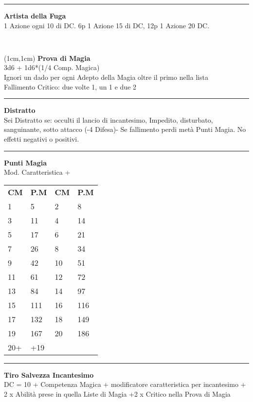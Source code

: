 \documentclass[a4paper,12 pt,openany]{book}
\newcommand{\riga}{\rule{\textwidth}{0.4pt}}
\begin{document}
\begin{textblock*}{7cm}
\riga

\textbf{Artista della Fuga}\\
1 Azione ogni 10 di DC. 6p 1 Azione 15 di DC, 12p 1 Azione 20 DC.

\end{textblock*}

~\newpage

\begin{textblock*}{5cm}(1cm,1cm) %
\textbf{Prova di Magia}\\
3d6 + 1d6*(1/4 Comp. Magica)\\
Ignori un dado per ogni Adepto della Magia oltre il primo nella lista\\
Fallimento Critico: due volte 1, un 1 e due 2\\


\riga

\textbf{Distratto}\\
Sei Distratto se: occulti il lancio di incantesimo, Impedito, disturbato, sanguinante, sotto attacco (-4 Difesa)-
Se fallimento perdi metà Punti Magia. No effetti negativi o positivi.\\

\riga

\textbf{Punti Magia}\\
Mod. Caratteristica + \\

\begin{tabular}{ll|ll}
\textbf{CM} & \textbf{P.M}&	\textbf{CM} & \textbf{P.M}\\
	1 &5 &2&8 \\
	3&11&4&14\\
	5&17&6&21\\
	7&26&8&34\\
	9&42&10&51\\
	11&61&12&72\\
	13&84&14&97\\
	15&111&16&116\\
	17&132&18&149\\
	19&167&20&186\\
	20+&+19&&\\
\end{tabular}

\riga

\textbf{Tiro Salvezza Incantesimo}\\
DC = 10 + Competenza Magica + modificatore caratteristica per incantesimo + 2 x Abilità prese in quella Liste di Magia +2 x Critico nella Prova di Magia


\end{textblock*}
\end{document}
